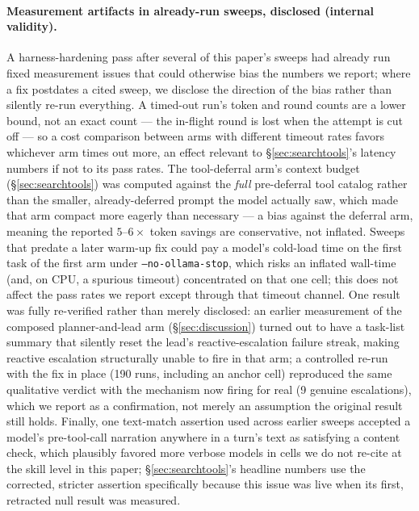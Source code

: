 \documentclass[smallcondensed,natbib]{svjour3}
\begin{document}
\paragraph{Measurement artifacts in already-run sweeps, disclosed (internal validity).} A
harness-hardening pass after several of this paper's sweeps had already
run fixed measurement issues that could otherwise bias the numbers we
report; where a fix postdates a cited sweep, we disclose the direction
of the bias rather than silently re-run everything. A timed-out run's
token and round counts are a lower bound, not an exact count --- the
in-flight round is lost when the attempt is cut off --- so a cost
comparison between arms with different timeout rates favors whichever
arm times out more, an effect relevant to \S\ref{sec:searchtools}'s
latency numbers if not to its pass rates. The tool-deferral arm's
context budget (\S\ref{sec:searchtools}) was computed against the
\emph{full} pre-deferral tool catalog rather than the smaller,
already-deferred prompt the model actually saw, which made that arm
compact more eagerly than necessary --- a bias against the deferral
arm, meaning the reported $5$--$6\times$ token savings are conservative,
not inflated. Sweeps that predate a later warm-up fix could pay a
model's cold-load time on the first task of the first arm under
\texttt{--no-ollama-stop}, which risks an inflated wall-time (and, on
CPU, a spurious timeout) concentrated on that one cell; this does not
affect the pass rates we report except through that timeout channel.
One result was fully re-verified rather than merely disclosed: an
earlier measurement of the composed planner-and-lead arm
(\S\ref{sec:discussion}) turned out to have a task-list summary that
silently reset the lead's reactive-escalation failure streak, making
reactive escalation structurally unable to fire in that arm; a
controlled re-run with the fix in place (190 runs, including an anchor
cell) reproduced the same qualitative verdict with the mechanism now
firing for real (9 genuine escalations), which we report as a
confirmation, not merely an assumption the original result still holds.
Finally, one text-match assertion used across earlier sweeps accepted a
model's pre-tool-call narration anywhere in a turn's text as satisfying
a content check, which plausibly favored more verbose models in cells
we do not re-cite at the skill level in this paper; \S\ref{sec:searchtools}'s
headline numbers use the corrected, stricter assertion specifically
because this issue was live when its first, retracted null result was
measured.
\end{document}
